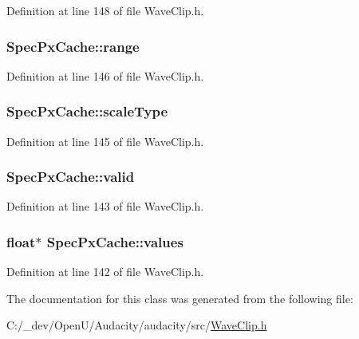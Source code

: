 Definition at line 148 of file Wave\+Clip.\+h.

\subsubsection[{\texorpdfstring{range}{range}}]{ Spec\+Px\+Cache\+::range}\hypertarget{class_spec_px_cache_a96de1d4e8b6d77973de29c4b3584cfc4}{}\label{class_spec_px_cache_a96de1d4e8b6d77973de29c4b3584cfc4}


Definition at line 146 of file Wave\+Clip.\+h.

\subsubsection[{\texorpdfstring{scale\+Type}{scaleType}}]{ Spec\+Px\+Cache\+::scale\+Type}\hypertarget{class_spec_px_cache_a796e0079edd616e1651edd8a4b9aa212}{}\label{class_spec_px_cache_a796e0079edd616e1651edd8a4b9aa212}


Definition at line 145 of file Wave\+Clip.\+h.

\subsubsection[{\texorpdfstring{valid}{valid}}]{ Spec\+Px\+Cache\+::valid}\hypertarget{class_spec_px_cache_a31c71c0f3307a1a81f44aa35d16ec042}{}\label{class_spec_px_cache_a31c71c0f3307a1a81f44aa35d16ec042}


Definition at line 143 of file Wave\+Clip.\+h.

\subsubsection[{\texorpdfstring{values}{values}}]{\setlength{\rightskip}{0pt plus 5cm}float$\ast$ Spec\+Px\+Cache\+::values}\hypertarget{class_spec_px_cache_a0c3a4884f54b874887d4051c1917a8e8}{}\label{class_spec_px_cache_a0c3a4884f54b874887d4051c1917a8e8}


Definition at line 142 of file Wave\+Clip.\+h.



The documentation for this class was generated from the following file\+:\begin{DoxyCompactItemize}
\item 
C\+:/\+\_\+dev/\+Open\+U/\+Audacity/audacity/src/\hyperlink{_wave_clip_8h}{Wave\+Clip.\+h}\end{DoxyCompactItemize}
